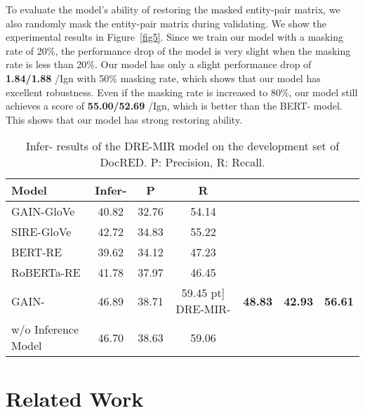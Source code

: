 \documentclass{article}
\begin{document}
\begin{table*}[th]
To evaluate the model's ability of restoring the masked entity-pair matrix, we also randomly mask the entity-pair matrix during validating.
We show the experimental results in Figure~\ref{fig5}.
Since we train our model with a masking rate of 20\%, the performance drop of the model is very slight when the masking rate is less than 20\%.
Our model has only a slight performance drop of \textbf{1.84/1.88} /Ign with 50\% masking rate, which shows that our model has excellent robustness.
Even if the masking rate is increased to 80\%, our model still achieves a score of \textbf{55.00/52.69} /Ign, which is better than the BERT-\cite{c:38} model.
This shows that our model has strong restoring ability.



\begin{table}[]
\centering
\begin{tabular}{p{3.5cm}ccc} 
\toprule
Model                       & Infer-      & P         &R         \\ [2pt] \toprule
GAIN-GloVe             &40.82          & 32.76     &54.14           \\
SIRE-GloVe             & 42.72         & 34.83     &55.22        \\ \toprule
BERT-RE             & 39.62         & 34.12     &47.23        \\
RoBERTa-RE              & 41.78         & 37.97     &46.45        \\
GAIN-            & 46.89         & 38.71     &59.45           \2pt] \toprule
DRE-MIR-        &  \textbf{48.83}           &  \textbf{42.93}     & \textbf{56.61}    \\
w/o Inference Model          &46.70     &38.63    &59.06   \\
\bottomrule
\end{tabular}
\caption{Infer- results of the DRE-MIR model on the development set of DocRED. P: Precision, R: Recall.}
\label{tab5}
\end{table}


\section{Related Work}





\end{table*}
\end{document}
